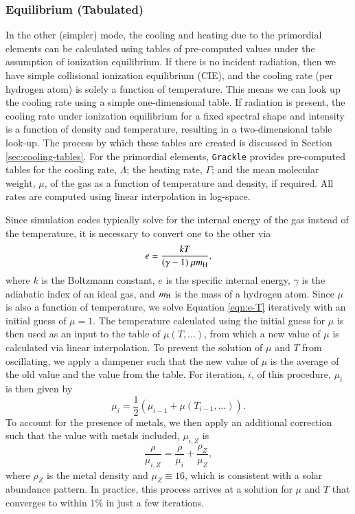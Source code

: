 \subsubsection{Equilibrium (Tabulated)} \label{sec:pri-tab}

In the other (simpler) mode, the cooling and heating due to the primordial
elements can be calculated using tables of pre-computed values under
the assumption of ionization equilibrium.  If there is
no incident radiation, then we have simple collisional ionization
equilibrium (CIE), and the cooling rate (per hydrogen atom) is solely a function of
temperature.  This means we can look up the cooling rate using a simple
one-dimensional table.   If radiation is present, the cooling rate under
ionization equilibrium for a fixed spectral shape and intensity is a
function of density and temperature, resulting in a two-dimensional table
look-up.  The process by which these tables are
created is discussed in Section \ref{sec:cooling-tables}.  For the
primordial elements, \texttt{Grackle} provides pre-computed tables for the cooling rate, $\Lambda$;
the heating rate, $\Gamma$; and the mean molecular weight, $\mu$, of
the gas as a function of temperature and density, if required.  All rates
are computed using linear interpolation in log-space.

Since simulation codes typically solve for the internal energy of the gas
instead of the temperature, it is necessary to convert one to the
other via
\begin{equation} \label{eqn:e-T}
e = \frac{k T}{(\gamma - 1)\ \mu m_{\rm H}},
\end{equation}
where $k$ is the Boltzmann constant, $e$ is
the specific internal energy, $\gamma$ is the adiabatic index of an
ideal gas, and $m_{\rm H}$ is the mass of a hydrogen atom.  Since $\mu$ is also a
function of temperature, we solve Equation \ref{eqn:e-T} iteratively
with an initial guess of $\mu = 1$.  The temperature calculated using
the initial guess for $\mu$ is then used as an input to the table of
$\mu(T,...)$, from which a new value of $\mu$ is calculated via
linear interpolation.  To prevent the solution of $\mu$ and $T$ from
oscillating, we apply a dampener such that the new value of $\mu$ is
the average of the old value and the value from the table.  For
iteration, $i$, of this procedure, $\mu_{i}$ is then given by
\begin{equation}
\mu_{i} = \frac{1}{2} (\mu_{i-1} + \mu(T_{i-1},...)).
\end{equation}
To account for the presence of metals, we then apply an additional
correction such that the value with metals included, $\mu_{i, Z}$ is
\begin{equation}
\frac{\rho}{\mu_{i, Z}} = \frac{\rho}{\mu_{i}} +
\frac{\rho_{Z}}{\mu_{Z}},
\end{equation}
where $\rho_{Z}$ is the metal density and $\mu_{Z} \equiv 16$, which
is consistent with a solar abundance pattern.  In practice, this
process arrives at a solution for $\mu$ and $T$ that converges to
within 1\% in just a few iterations.

